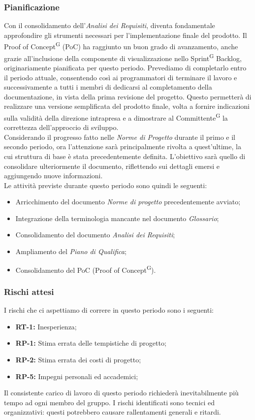 \documentclass[8pt]{article}
\newcommand{\glossterm}[1]{#1\textsuperscript{G}} %
\begin{document}
\subsubsection{Pianificazione}
Con il consolidamento dell'\textit{Analisi dei Requisiti}, diventa fondamentale approfondire gli
strumenti necessari per l'implementazione finale del prodotto. Il \glossterm{Proof of Concept} (PoC) ha
raggiunto un buon grado di avanzamento, anche grazie all'inclusione della componente di
visualizzazione nello \glossterm{Sprint} Backlog, originariamente pianificata per questo periodo.
Prevediamo di completarlo entro il periodo attuale, consentendo così ai programmatori di terminare
il lavoro e successivamente a tutti i membri di dedicarsi al completamento della documentazione, in
vista della prima revisione del progetto. Questo permetterà di realizzare una versione semplificata
del prodotto finale, volta a fornire indicazioni sulla validità della direzione intrapresa e a
dimostrare al \glossterm{Committente} la correttezza dell'approccio di sviluppo.\\
Considerando il progresso fatto nelle \textit{Norme di Progetto} durante il primo e il secondo
periodo, ora l'attenzione sarà principalmente rivolta a quest'ultime, la cui struttura di base è
stata precedentemente definita. L'obiettivo sarà quello di consolidare ulteriormente il documento,
riflettendo sui dettagli emersi e aggiungendo nuove informazioni.\\
Le attivit\`{a} previste durante questo periodo sono quindi le seguenti:
\begin{itemize}
\setlength{\itemsep}{0em}
    \item Arricchimento del documento \textit{Norme di progetto} precedentemente avviato;
    \item Integrazione della terminologia mancante nel documento \textit{Glossario};
    \item Consolidamento del documento \textit{Analisi dei Requisiti};
    \item Ampliamento del \textit{Piano di Qualifica};
    \item Consolidamento del PoC (\glossterm{Proof of Concept}).
\end{itemize}
\subsubsection{Rischi attesi}
I rischi che ci aspettiamo di correre in questo periodo sono i seguenti: 
\begin{itemize}
\setlength{\itemsep}{0em}
\item \textbf{RT-1:} Inesperienza;
\item \textbf{RP-1:} Stima errata delle tempistiche di progetto;
\item \textbf{RP-2:} Stima errata dei costi di progetto;
\item \textbf{RP-5:} Impegni personali ed accademici;
\end{itemize}
Il consistente carico di lavoro di questo periodo richiederà inevitabilmente più tempo ad ogni membro del gruppo. I rischi identificati sono tecnici ed organizzativi: questi potrebbero causare rallentamenti generali e ritardi.
\clearpage
\end{document}
